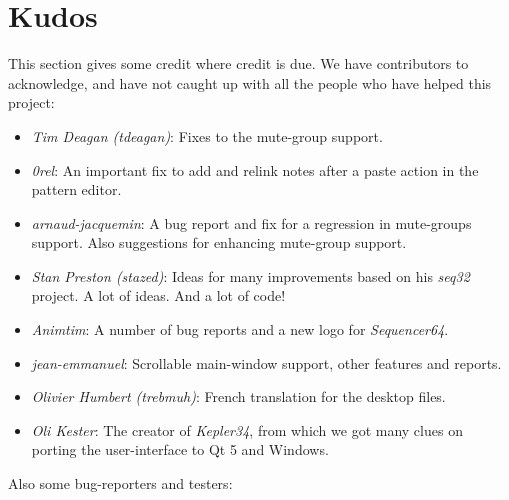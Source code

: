%
%
%

\section{Kudos}
\label{sec:kudos}

   This section gives some credit where credit is due.
   We have contributors to acknowledge, and have not caught up with all the
   people who have helped this project:

   \begin{itemize}
      \item \textsl{Tim Deagan (tdeagan)}:
         Fixes to the mute-group support.
      \item \textsl{0rel}:
         An important fix to add and relink notes after a
         paste action in the pattern editor.
      \item \textsl{arnaud-jacquemin}:
         A bug report and fix for a regression in mute-groups support.
         Also suggestions for enhancing mute-group support.
      \item \textsl{Stan Preston (stazed)}:
         Ideas for many improvements based
         on his \textsl{seq32} project.  A lot of ideas.
         And a lot of code!
      \item \textsl{Animtim}:
         A number of bug reports and a new logo for \textsl{Sequencer64}.
      \item \textsl{jean-emmanuel}:
         Scrollable main-window support, other features and reports.
      \item \textsl{Olivier Humbert (trebmuh)}:
         French translation for the desktop files.
      \item \textsl{Oli Kester}:
         The creator of \textsl{Kepler34}, from which we got many
         clues on porting the user-interface to Qt 5 and Windows.
   \end{itemize}

   Also some bug-reporters and testers:

